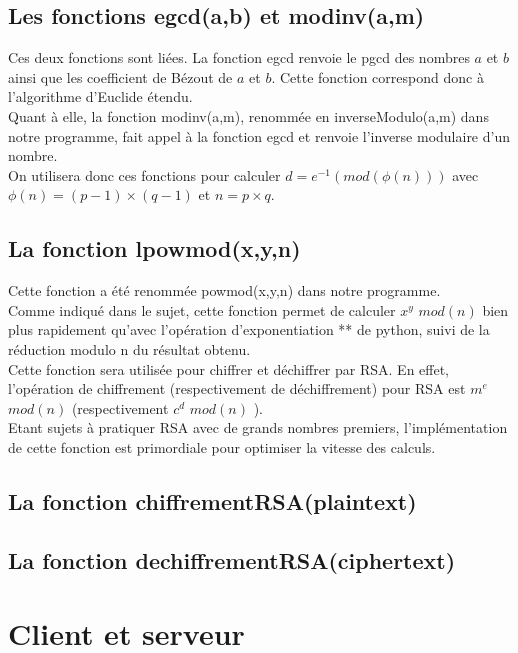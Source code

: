 \documentclass[12pt]{article}
\theoremstyle{definition}
\begin{document}
	\subsection{Les fonctions egcd(a,b) et modinv(a,m)}
	Ces deux fonctions sont liées. La fonction egcd renvoie le pgcd des nombres $a$ et $b$ ainsi que les coefficient de Bézout de $a$ et $b$. Cette fonction correspond donc à l'algorithme d'Euclide étendu.\\
	Quant à elle, la fonction modinv(a,m), renommée en inverseModulo(a,m) dans notre programme, fait appel à la fonction egcd et renvoie l'inverse modulaire d'un nombre.\\
	On utilisera donc ces fonctions pour calculer $d=e^{-1}  (mod(\phi (n)))$ avec $\phi(n) = (p-1) \times (q-1)$ et $n = p \times q$.
	 \subsection{La fonction lpowmod(x,y,n)}
Cette fonction a été renommée powmod(x,y,n) dans notre programme.\\
	 Comme indiqué dans le sujet, cette fonction permet de calculer $x^y$ $mod(n)$ bien plus rapidement qu'avec l'opération d'exponentiation ** de python, suivi de la réduction modulo n du résultat obtenu.\\
	 Cette fonction sera utilisée pour chiffrer et déchiffrer par RSA. En effet, l'opération de chiffrement (respectivement de déchiffrement) pour RSA est $m^e$ $mod(n)$ (respectivement $c^d$ $mod(n)$ ).\\
	 Etant sujets à pratiquer RSA avec de grands nombres premiers, l'implémentation de cette fonction est primordiale pour optimiser la vitesse des calculs.
	 \subsection{La fonction chiffrementRSA(plaintext)}
	 \subsection{La fonction dechiffrementRSA(ciphertext)}
	
\vfill \eject

\section{Client et serveur}
\end{document}
